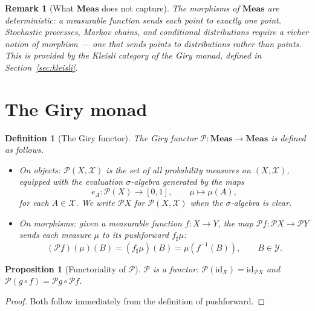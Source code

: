 \documentclass[11pt]{article}
\newtheorem{definition}{Definition}
\newtheorem{proposition}{Proposition}
\newtheorem{remark}{Remark}
\newcommand{\Meas}{\mathbf{Meas}}
\newcommand{\Pcal}{\mathcal{P}}
\newcommand{\Xcal}{\mathcal{X}}
\newcommand{\Ycal}{\mathcal{Y}}
\newcommand{\id}{\mathrm{id}}
\begin{document}
\begin{remark}[What $\Meas$ does not capture]
The morphisms of $\Meas$ are deterministic: a measurable function sends each
point to exactly one point.  Stochastic processes, Markov chains, and
conditional distributions require a richer notion of morphism --- one that
sends points to \emph{distributions} rather than points.  This is provided
by the Kleisli category of the Giry monad, defined in Section~\ref{sec:kleisli}.
\end{remark}

\section{The Giry monad}\label{sec:giry}

\begin{definition}[The Giry functor]\label{def:giry-functor}
The \emph{Giry functor} $\Pcal : \Meas \to \Meas$ is defined as follows.
\begin{itemize}
  \item \emph{On objects}: $\Pcal(X, \Xcal)$ is the set of all probability
    measures on $(X, \Xcal)$, equipped with the \emph{evaluation
    $\sigma$-algebra} generated by the maps
    \[
      e_A : \Pcal(X) \to [0,1], \qquad \mu \mapsto \mu(A),
    \]
    for each $A \in \Xcal$.  We write $\Pcal X$ for $\Pcal(X, \Xcal)$ when
    the $\sigma$-algebra is clear.
  \item \emph{On morphisms}: given a measurable function $f : X \to Y$, the
    map $\Pcal f : \Pcal X \to \Pcal Y$ sends each measure $\mu$ to its
    \emph{pushforward} $f_\sharp \mu$:
    \[
      (\Pcal f)(\mu)(B) = (f_\sharp \mu)(B) = \mu(f^{-1}(B)), \qquad B \in \Ycal.
    \]
\end{itemize}
\end{definition}

\begin{proposition}[Functoriality of $\Pcal$]
$\Pcal$ is a functor: $\Pcal(\id_X) = \id_{\Pcal X}$ and
$\Pcal(g \circ f) = \Pcal g \circ \Pcal f$.
\end{proposition}

\begin{proof}
Both follow immediately from the definition of pushforward.
\end{proof}
\end{document}
